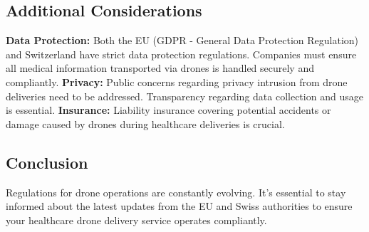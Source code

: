 \subsection{Additional Considerations}
\textbf{Data Protection:} Both the EU (GDPR - General Data Protection Regulation) and Switzerland have strict data protection regulations. Companies must ensure all medical information transported via drones is handled securely and compliantly.
\newline
\textbf{Privacy:} Public concerns regarding privacy intrusion from drone deliveries need to be addressed. Transparency regarding data collection and usage is essential.
\newline
\textbf{Insurance:} Liability insurance covering potential accidents or damage caused by drones during healthcare deliveries is crucial.
\subsection{Conclusion}
Regulations for drone operations are constantly evolving.  It's essential to stay informed about the latest updates from the EU and Swiss authorities to ensure your healthcare drone delivery service operates compliantly.
